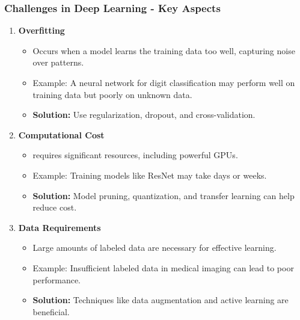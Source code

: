 \documentclass[aspectratio=169]{beamer}
\begin{document}
\begin{frame}
    \frametitle{Challenges in Deep Learning - Key Aspects}
    \begin{enumerate}
        \item \textbf{Overfitting}
            \begin{itemize}
                \item Occurs when a model learns the training data too well, capturing noise over patterns.
                \item Example: A neural network for digit classification may perform well on training data but poorly on unknown data.
                \item \textbf{Solution:} Use regularization, dropout, and cross-validation.
            \end{itemize}
        \item \textbf{Computational Cost}
            \begin{itemize}
                \item requires significant resources, including powerful GPUs.
                \item Example: Training models like ResNet may take days or weeks.
                \item \textbf{Solution:} Model pruning, quantization, and transfer learning can help reduce cost.
            \end{itemize}
        \item \textbf{Data Requirements}
            \begin{itemize}
                \item Large amounts of labeled data are necessary for effective learning.
                \item Example: Insufficient labeled data in medical imaging can lead to poor performance.
                \item \textbf{Solution:} Techniques like data augmentation and active learning are beneficial.
            \end{itemize}
    \end{enumerate}
\end{frame}
\end{document}
